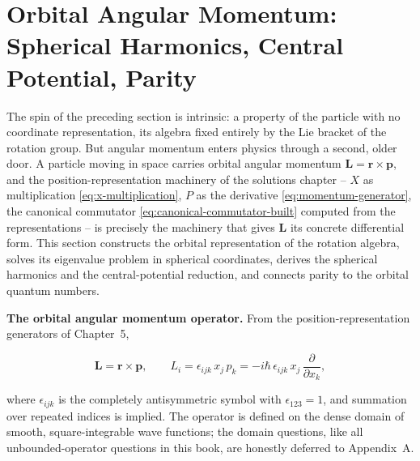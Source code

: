 \section{Orbital Angular Momentum: Spherical Harmonics, Central Potential, Parity}
\label{sec:orbital-angular-momentum}

The spin of the preceding section is intrinsic: a property of the particle with no coordinate representation, its algebra fixed entirely by the Lie bracket of the rotation group. But angular momentum enters physics through a second, older door. A particle moving in space carries orbital angular momentum $\bm L = \bm r \times \bm p$, and the position-representation machinery of the solutions chapter -- $X$ as multiplication \eqref{eq:x-multiplication}, $P$ as the derivative \eqref{eq:momentum-generator}, the canonical commutator \eqref{eq:canonical-commutator-built} computed from the representations -- is precisely the machinery that gives $\bm L$ its concrete differential form. This section constructs the orbital representation of the rotation algebra, solves its eigenvalue problem in spherical coordinates, derives the spherical harmonics and the central-potential reduction, and connects parity to the orbital quantum numbers.

\medskip\noindent\textbf{The orbital angular momentum operator.}
From the position-representation generators of Chapter~5,
\begin{linenomath}
  \begin{equation}
    \bm L = \bm r \times \bm p,
    \qquad
    L_i = \epsilon_{ijk}\,x_j\,p_k
    = -i\hbar\,\epsilon_{ijk}\,x_j\,\frac{\partial}{\partial x_k},
    \label{eq:orbital-L}
  \end{equation}
\end{linenomath}
where $\epsilon_{ijk}$ is the completely antisymmetric symbol with $\epsilon_{123} = 1$, and summation over repeated indices is implied. The operator is defined on the dense domain of smooth, square-integrable wave functions; the domain questions, like all unbounded-operator questions in this book, are honestly deferred to Appendix~A.

